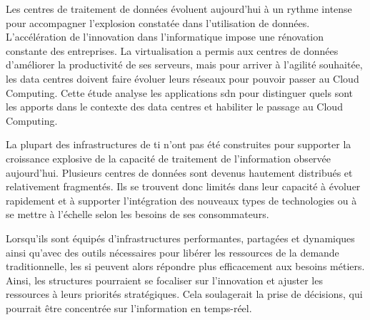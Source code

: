 


Les centres de traitement de données évoluent aujourd'hui à un rythme intense pour accompagner l'explosion constatée dans l'utilisation de données. L'accélération de l'innovation dans l'informatique impose une rénovation constante des entreprises. La virtualisation a permis aux centres de données d'améliorer la productivité de ses serveurs, mais pour arriver à l'agilité souhaitée, les data centres doivent faire évoluer leurs réseaux pour pouvoir passer au Cloud Computing. Cette étude analyse les applications \gls{sdn} pour distinguer quels sont les apports dans le contexte des data centres et habiliter le passage au Cloud Computing.

\par 
La plupart des infrastructures de \gls{ti} n'ont pas été construites pour supporter la croissance explosive de la capacité de traitement de l'information observée aujourd'hui. Plusieurs centres de données sont devenus hautement distribués et relativement fragmentés. Ils se trouvent donc limités dans leur capacité à évoluer rapidement et à supporter l'intégration des nouveaux types de technologies ou à se mettre à l'échelle selon les besoins de ses consommateurs.

\par 
Lorsqu'ils sont équipés d'infrastructures performantes, partagées et dynamiques ainsi qu'avec des outils nécessaires pour libérer les ressources de la demande traditionnelle, les \gls{si} peuvent alors répondre plus efficacement aux besoins métiers. Ainsi, les structures pourraient se focaliser sur l'innovation et ajuster les ressources à leurs priorités stratégiques. Cela soulagerait la prise de décisions, qui pourrait être concentrée sur l'information en temps-réel. \cite{hpAlcatelCreatinCloudDCchallenges}

